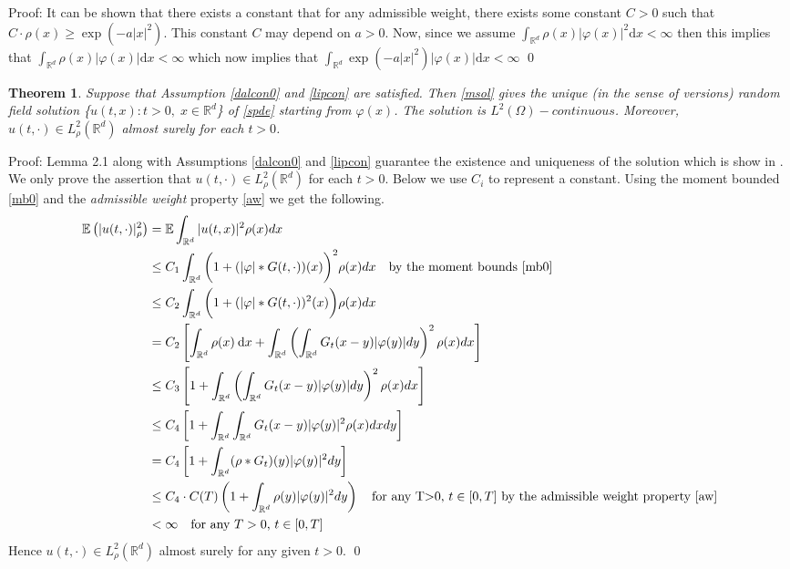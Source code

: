 \documentclass{article}
\newtheorem{theorem}{Theorem}[section]
\numberwithin{equation}{section}
\newcommand{\R}{\mathbb{R}}
\newcommand{\E}{\mathbb{E}}
\newcommand{\ud}{\ensuremath{\mathrm{d}}}
\begin{document}
Proof: It can be shown that there exists a constant that for any admissible weight, there exists some constant $C>0$ such that $C \cdot \rho(x) \ge  \exp(-a|x|^2)$. This constant $C$ may depend on $a>0$. Now, since we assume $\int_{\R^d}\rho(x)|\varphi(x)|^2\ud x < \infty $ then this implies that $\int_{\R^d}\rho(x)|\varphi(x)|\ud x < \infty $ which now implies that $\int_{\R^d}\exp(-a|x|^2)|\varphi(x)|\ud x < \infty $ \qed
\\

\begin{theorem} \textit{Suppose that Assumption \ref{dalcon0} and \ref{lipcon} are satisfied. Then \eqref{msol} gives the unique (in the sense of versions) random field solution \{$u(t,x): t>0, \; x\in\R^d$\} of \eqref{spde} starting from $\varphi(x)$. The solution is $L^2(\Omega)-continuous$. Moreover, $u(t,\cdot)\in L^2_\rho(\R^d)$ almost surely for each $t>0$.} 
\end{theorem}

Proof: Lemma 2.1 along with Assumptions \ref{dalcon0} and \ref{lipcon} guarantee the existence and uniqueness of the  solution which is show in \cite{CH16Comparison}. We only prove the assertion that $u(t,\cdot)\in L^2_\rho(\R^d)$ for each $t>0$. Below we use $C_i$ to represent a constant. Using the moment bounded \eqref{mb0} and the \textit{admissible weight} property \eqref{aw} we get the following.
\begin{align*}
\E\left(| u(t,\cdot)|_\rho^2\right) &= \E \int_{\mathbb R^d}\vert u(t,x) \vert^2 \rho(x)dx 
\\&\le C_1 \int_{\mathbb R^d}\bigg(1+(|\varphi|*G(t,\cdot))(x)\bigg)^2\rho(x)dx  \quad \text{by the moment bounds \eqref{mb0}}
\\&\le C_2 \int_{\mathbb R^d}\bigg(1+(|\varphi|*G(t,\cdot))^2(x)\bigg)\rho(x)dx
\\ &= C_2\left[\int_{\mathbb R^d}\rho(x)\: \ud x +\int_{\mathbb R^d}\left(\int_{\R^d}G_t(x-y)|\varphi(y)|dy\right)^2\rho(x)dx \right]
\\ &\le C_3\left[1+\int_{\mathbb R^d}\left(\int_{\R^d}G_t(x-y)|\varphi(y)|dy\right)^2\rho(x)dx\right]
\\ &\le C_4\left[1+\int_{\mathbb R^d}\int_{\R^d}G_t(x-y)|\varphi(y)|^2\rho(x)dxdy\right]
\\ &= C_4 \left[1+\int_{\R^d}(\rho*G_t)(y)|\varphi(y)|^2dy\right]
\\ &\le C_4\cdot C(T)\left(1+\int_{\R^d}\rho(y)|\varphi(y)|^2dy\right) \quad \text{for any T$>$0, $t \in [0,T]$ by the admissible weight property \eqref{aw}} 
\\ &< \infty \quad \text{for any $T>0$, $t \in [0,T]$} 
\end{align*}
Hence $u(t,\cdot) \in L^2_{\rho}(\R^d)$ almost surely for any given $t>0$. \qed \\
\end{document}
